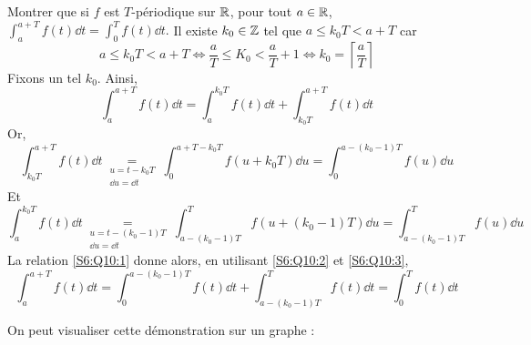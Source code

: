 \documentclass{article}
\begin{document}
\pagebreak

\begin{question_kholle}{Montrer que si $f$ est $T$-périodique sur $\mathbb R$, pour tout $a\in\mathbb R$, $\displaystyle\int_{a}^{a+T}f(t)\dd t = \int_{0}^{T}f(t)\dd t$.}
  Il existe $k_0\in\mathbb Z$ tel que $a\leq k_0 T<a+T$ car
  \begin{equation*}
    a\leq k_0T<a+T \iff \frac{a}{T} \leq K_0 < \frac{a}{T}+1 \iff k_0 = \left\lceil \frac{a}{T}\right\rceil
  \end{equation*}
  Fixons un tel $k_0$. Ainsi,
  \begin{equation}\label{S6:Q10:1}
    \int_{a}^{a+T}{f(t)\dd t} = \int_{a}^{k_0T}{f(t)\dd t} + \int_{k_0T}^{a+T}{f(t)\dd t}
  \end{equation}
  Or,
  \begin{equation}\label{S6:Q10:2}
    \int_{k_0T}^{a+T}{f(t)\dd t} \underset{\substack{u=t-k_0T \\ \dd u=\dd t}}{=} \int_{0}^{a+T-k_0T}{f(u+k_0T)\dd u} = \int_{0}^{a-(k_0-1)T}{f(u)\dd u}
  \end{equation}
  Et
  \begin{equation}\label{S6:Q10:3}
    \int_{a}^{k_0T}{f(t)}{\dd t} \underset{\substack{u=t-(k_0-1)T \\ \dd u=\dd t}}{=} \int_{a-(k_0-1)T}^{T}{f(u+(k_0-1)T)\dd u} = \int_{a-(k_0-1)T}^{T}{f(u)\dd u}
  \end{equation}
  La relation \eqref{S6:Q10:1} donne alors, en utilisant \eqref{S6:Q10:2} et \eqref{S6:Q10:3},
  \begin{equation}\label{S6:Q10:4}
    \int_{a}^{a+T}{f(t)\dd t} = \int_{0}^{a-(k_0-1)T}{f(t)\dd t}+\int_{a-(k_0-1)T}^{T}{f(t)\dd t} = \int_{0}^{T}{f(t)\dd t}
  \end{equation}

  On peut visualiser cette démonstration sur un graphe :

  \begin{figure}[H]
    \centering
\end{figure}
\end{question_kholle}
\end{document}
